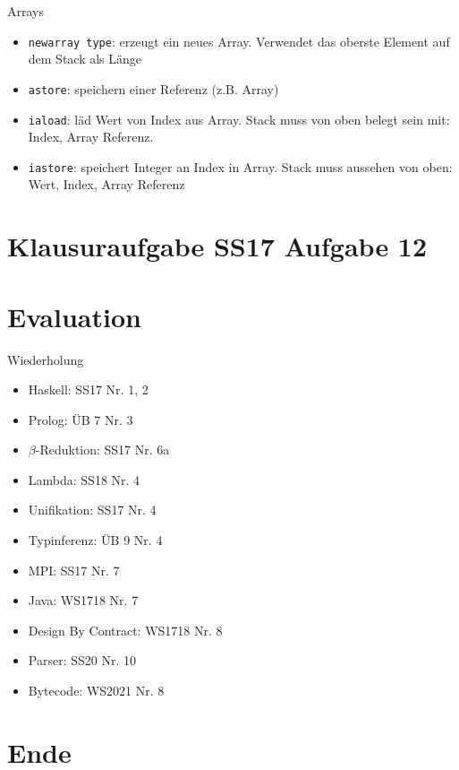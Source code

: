 \documentclass{beamer}
\begin{document}
\begin{frame}{Arrays}
    \begin{itemize}
        \item \texttt{newarray type}: erzeugt ein neues Array. Verwendet das oberste Element auf dem Stack als Länge
        \item \texttt{astore}: speichern einer Referenz (z.B. Array)
        \item \texttt{iaload}: läd Wert von Index aus Array. Stack muss von oben belegt sein mit: Index, Array Referenz.
        \item \texttt{iastore}: speichert Integer an Index in Array. Stack muss aussehen von oben: Wert, Index, Array Referenz
    \end{itemize}
\end{frame}

\section{Klausuraufgabe SS17 Aufgabe 12}

\section{Evaluation}

\begin{frame}{Wiederholung}
    \begin{itemize}
        \item Haskell: SS17 Nr. 1, 2
        \item Prolog: ÜB 7 Nr. 3
        \item $\beta$-Reduktion: SS17 Nr. 6a
        \item Lambda: SS18 Nr. 4
        \item Unifikation: SS17 Nr. 4
        \item Typinferenz: ÜB 9 Nr. 4
        \item MPI: SS17 Nr. 7
        \item Java: WS1718 Nr. 7
        \item Design By Contract: WS1718 Nr. 8
        \item Parser: SS20 Nr. 10
        \item Bytecode: WS2021 Nr. 8
    \end{itemize}
\end{frame}
\section{Ende}
\end{document}
